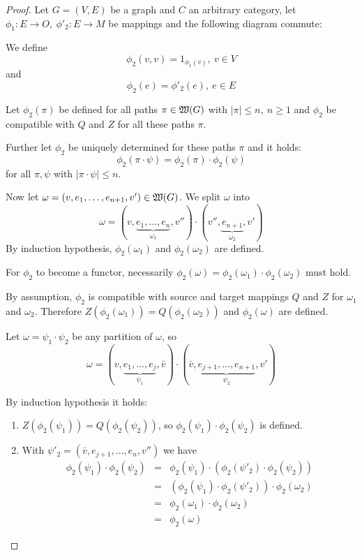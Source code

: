 \begin{proof}
Let $G = (V, E)$ be a graph and $C$ an arbitrary category, let $\phi_1 :
E \to O,\ \phi'_2 : E \to M$ be mappings and the following diagram commute:

\begin{center}
\end{center}

We define 
\[ \phi_2(v,v) = 1_{\phi_1(v)},\ v \in V \] 
and 
\[ \phi_2(e) = \phi'_2(e),\ e \in E \]

Let $\phi_2(\pi)$ be defined for all paths $\pi \in \mbox{$\mathfrak{W}(G)$}$ with $|\pi|
\leq n,\ n \geq 1$ and $\phi_2$ be compatible with $Q$ and $Z$ for all these
paths $\pi$.

Further let $\phi_2$ be uniquely determined for these paths $\pi$ and it holds:
\[ \phi_2(\pi \cdot \psi) = \phi_2(\pi) \cdot \phi_2(\psi) \]
for all $\pi, \psi$ with $|\pi \cdot \psi| \leq n$.

Now let $\omega = (v, e_1, \ldots, e_{n+1}, v') \in \mbox{$\mathfrak{W}(G)$}$. We split
$\omega$ into 
\[ \omega = (v, \underbrace{e_1, \ldots, e_n}_{\omega_1}, v'') \cdot (v'',
\underbrace{e_{n+1}}_{\omega_2}, v')
\]
By induction hypothesis, $\phi_2(\omega_1)$ and $\phi_2(\omega_2)$ are defined.

For $\phi_2$ to become a functor, necessarily $\phi_2(\omega) = \phi_2(\omega_1)
\cdot \phi_2(\omega_2)$ must hold.

By assumption, $\phi_2$ is compatible with source and target mappings $Q$ and
$Z$ for $\omega_1$ and $\omega_2$. Therefore $Z(\phi_2(\omega_1)) =
Q(\phi_2(\omega_2))$ and $\phi_2(\omega)$ are defined.

Let $\omega = \psi_1 \cdot \psi_2$ be any partition of $\omega$, so 
\[ \omega = (v, \underbrace{e_1, \ldots, e_j}_{\psi_1}, \bar{v}) \cdot (\bar{v},
\underbrace{e_{j+1}, \ldots, e_{n+1}}_{\psi_2}, v') \]

By induction hypothesis it holds:
\begin{enumerate}
  \item $Z(\phi_2(\psi_1)) = Q(\phi_2(\psi_2))$, so $\phi_2(\psi_1) \cdot
  \phi_2(\psi_2)$ is defined.
  \item With $\psi'_2 = (\bar{v}, e_{j+1}, \ldots, e_n, v'')$ we have
  \begin{eqnarray*}
  \phi_2(\psi_1) \cdot \phi_2(\psi_2) & = & \phi_2(\psi_1) \cdot
  (\phi_2(\psi'_2) \cdot \phi_2(\psi_2)) \\
  & = & (\phi_2(\psi_1) \cdot \phi_2(\psi'_2)) \cdot \phi_2(\omega_2) \\
  & = & \phi_2(\omega_1) \cdot \phi_2(\omega_2) \\
  & = & \phi_2(\omega)
  \end{eqnarray*}
\end{enumerate}


\end{proof}
